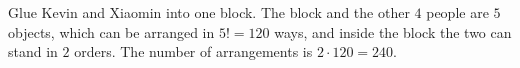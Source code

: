 Glue Kevin and Xiaomin into one block. The block and the other $4$ people are $5$ objects, which can be arranged in $5!=120$ ways, and inside the block the two can stand in $2$ orders. The number of arrangements is $2\cdot120=\boxed{240}$.
